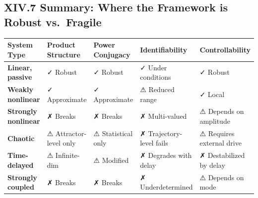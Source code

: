 \documentclass[
]{article}
\begin{document}
\subsection{XIV.7 Summary: Where the Framework is Robust
vs.~Fragile}\label{xiv.7-summary-where-the-framework-is-robust-vs.-fragile}

\begin{longtable}[]{@{}
  >{\raggedright\arraybackslash}p{}
  >{\raggedright\arraybackslash}p{}
  >{\raggedright\arraybackslash}p{}
  >{\raggedright\arraybackslash}p{}
  >{\raggedright\arraybackslash}p{}@{}}
\toprule\noalign{}
\begin{minipage}[b]{\linewidth}\raggedright
System Type
\end{minipage} & \begin{minipage}[b]{\linewidth}\raggedright
Product Structure
\end{minipage} & \begin{minipage}[b]{\linewidth}\raggedright
Power Conjugacy
\end{minipage} & \begin{minipage}[b]{\linewidth}\raggedright
Identifiability
\end{minipage} & \begin{minipage}[b]{\linewidth}\raggedright
Controllability
\end{minipage} \\
\midrule\noalign{}
\endhead
\bottomrule\noalign{}
\endlastfoot
\textbf{Linear, passive} & ✓ Robust & ✓ Robust & ✓ Under conditions & ✓
Robust \\
\textbf{Weakly nonlinear} & ✓ Approximate & ✓ Approximate & ⚠ Reduced
range & ✓ Local \\
\textbf{Strongly nonlinear} & ✗ Breaks & ✗ Breaks & ✗ Multi-valued & ⚠
Depends on amplitude \\
\textbf{Chaotic} & ⚠ Attractor-level only & ⚠ Statistical only & ✗
Trajectory-level fails & ⚠ Requires external drive \\
\textbf{Time-delayed} & ⚠ Infinite-dim & ⚠ Modified & ✗ Degrades with
delay & ✗ Destabilized by delay \\
\textbf{Strongly coupled} & ✗ Breaks & ✗ Breaks & ✗ Underdetermined & ⚠
Depends on mode \\
\end{longtable}
\end{document}
